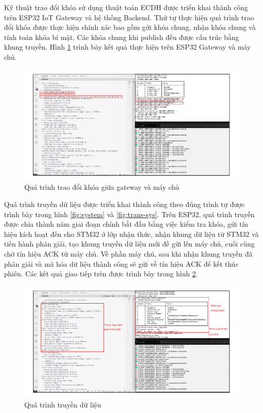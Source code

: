 Kỹ thuật trao đổi khóa sử dụng thuật toán ECDH được triển khai thành công trên ESP32 IoT Gateway và hệ thống Backend. Thứ tự thực hiện quá trình trao đổi khóa được thực hiện chính xác bao gồm gửi khóa chung, nhận khóa chung và tính toán khóa bí mật. Các khóa chung khi publish đều được cấu trúc bằng khung truyền. Hình \ref{fig:logecdh} trình bày kết quả thực hiện trên ESP32 Gateway và máy chủ.

\begin{figure}[h]
    \centering
    \includegraphics[width=1\linewidth]{ecdhlog.pdf}
    \caption{Quá trình trao đổi khóa giữa gateway và máy chủ}
    \label{fig:logecdh}
\end{figure}

Quá trình truyền dữ liệu được triển khai thành công theo đúng trình tự được trình bày trong hình \ref{fig:system} và \ref{fig:trans-sys}. Trên ESP32, quá trình truyền được chia thành năm giai đoạn chính bắt đầu bằng việc kiểm tra khóa, gửi tín hiệu kích hoạt đến cho STM32 ở lớp nhận thức, nhận khung dữ liệu từ STM32 và tiến hành phân giải, tạo khung truyền dữ liệu mới đề gửi lên máy chủ, cuối cùng chờ tín hiệu ACK từ máy chủ. Về phần máy chủ, sau khi nhận khung truyền đã phân giải và mã hóa dữ liệu thành công sẽ gửi về tín hiệu ACK để kết thúc phiên. Các kết quả giao tiếp trên được trình bày trong hình \ref{fig:datalog}.
\begin{figure}[h]
    \centering
    \includegraphics[width=1\linewidth]{datalog.pdf}
    \caption{Quá trình truyền dữ liệu}
    \label{fig:datalog}
\end{figure}

